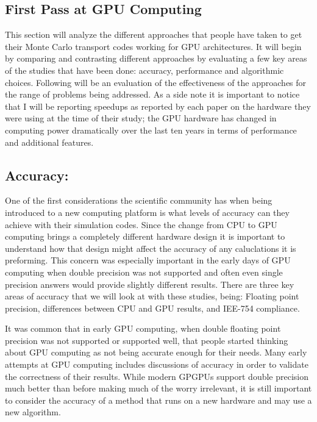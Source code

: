 \subsection{ \textbf{First Pass at GPU Computing}}

This section will analyze the different approaches that people have taken to get their Monte Carlo transport codes working for GPU architectures.
%
It will begin by comparing and contrasting different approaches by evaluating a few key areas of the studies that have been done: accuracy, performance and algorithmic choices.
%
Following will be an evaluation of the effectiveness of the approaches for the range of problems being addressed.
%
As a side note it is important to notice that I will be reporting speedups as reported by each paper on the hardware they were using at the time of their study; the GPU hardware has changed in computing power dramatically over the last ten years in terms of performance and additional features.

\subsection*{ \textbf{Accuracy:} }

One of the first considerations the scientific community has when being introduced to a new computing platform is what levels of accuracy can they achieve with their simulation codes.
%
Since the change from CPU to GPU computing brings a completely different hardware design it is important to understand how that design might affect the accuracy of any caluclations it is preforming.
%
This concern was especially important in the early days of GPU computing when double precision was not supported and often even single precision answers would provide slightly different results.
%
There are three key areas of accuracy that we will look at with these studies, being: Floating point precision, differences between CPU and GPU results, and IEE-754 compliance.
%

%
It was common that in early GPU computing, when double floating point precision was not supported or supported well, that people started thinking about GPU computing as not being accurate enough for their needs.
%
Many early attempts at GPU computing includes discussions of accuracy in order to validate the correctness of their results.
%
While modern GPGPUs support double precision much better than before making much of the worry irrelevant, it is still important to consider the accuracy of a method that runs on a new hardware and may use a new algorithm.
%

